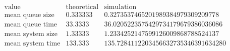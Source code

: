 \[\begin{array}{cccc}
 \text{value} & \text{theoretical} & \text{simulation} & \text{} \\
 \text{mean queue size} & 0.333333 & 0.3273537465201989384979309209778 & \text{} \\
 \text{mean queue time} & 33.3333 & 36.0205223575429734179679386036086 & \text{} \\
 \text{mean system size} & 1.33333 & 1.2334252147599126009868788524137 & \text{} \\
 \text{mean system time} & 133.333 & 135.7284112203456632735346391634280 & \text{} \\
\end{array}\]

